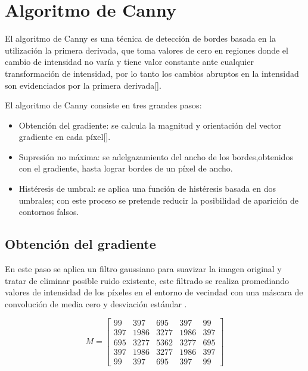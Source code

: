 \section{Algoritmo de Canny}

El algoritmo de Canny es una técnica de detección de bordes basada en la utilización la primera derivada, que toma
valores de cero en regiones donde el cambio de intensidad no varía y tiene valor constante ante cualquier transformación
de intensidad, por lo tanto los cambios abruptos en la intensidad son evidenciados por la primera derivada[].

El algoritmo de Canny consiste en tres grandes pasos: 

\begin{itemize}
\item Obtención del gradiente: se calcula la magnitud y orientación del vector gradiente en cada píxel[]. 
\item Supresión no máxima: se adelgazamiento del ancho de los bordes,obtenidos con el gradiente, hasta lograr bordes de
un píxel de ancho. 
\item Histéresis de umbral: se aplica una función de histéresis basada en dos umbrales; con este proceso se pretende
reducir la posibilidad de aparición de contornos falsos. 
\end{itemize}

\subsection{Obtención del gradiente}

En este paso se aplica un filtro gaussiano para suavizar la imagen original y tratar de eliminar posible ruido existente,
este filtrado se realiza promediando valores de intensidad de los píxeles en el entorno de vecindad con una 
máscara de convolución de media cero y desviación estándar \sigma.

\begin{equation}
M =\begin{bmatrix}
99 & 397 & 695 & 397 & 99 \\ 
397 & 1986 & 3277 & 1986 & 397 \\ 
695 & 3277 & 5362 & 3277 & 695 \\ 
397 & 1986 & 3277 & 1986 & 397 \\ 
99 & 397 & 695 & 397 & 99
\end{bmatrix}
\end{equation}

